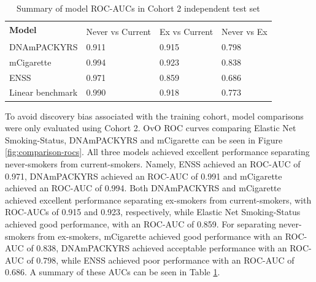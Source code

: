 \documentclass[draft]{article} %
\begin{document}
\begin{table}[p]
    \caption{Summary of model ROC-AUCs in Cohort 2 independent test set} \label{table:auc-comparison}
    \begin{tabularx}{\textwidth}{X >{\centering\arraybackslash}X >{\centering\arraybackslash}X >{\centering\arraybackslash}X}
        \toprule
        \multirow{2}{*}{\textbf{Model}} & \multicolumn{3}{c}{\textbf{AUC}}                               \\
        \cmidrule(lr){2-4}
                                        & Never vs Current                 & Ex vs Current & Never vs Ex \\
        \midrule
        DNAmPACKYRS                     & \num{0.911}                      & \num{0.915}   & \num{0.798} \\
        \addlinespace
        mCigarette                      & \num{0.994}                      & \num{0.923}   & \num{0.838} \\
        \addlinespace
        ENSS                            & \num{0.971}                      & \num{0.859}   & \num{0.686} \\
        \addlinespace
        Linear benchmark                & \num{0.990}                      & \num{0.918}   & \num{0.773} \\
        \bottomrule
    \end{tabularx}
\end{table}

To avoid discovery bias associated with the training cohort, model comparisons were only evaluated using Cohort 2. OvO ROC curves comparing Elastic Net Smoking-Status, DNAmPACKYRS and mCigarette can be seen in Figure \ref{fig:comparison-rocs}. All three models achieved excellent performance separating never-smokers from current-smokers. Namely, ENSS achieved an ROC-AUC of 0.971, DNAmPACKYRS achieved an ROC-AUC of 0.991 and mCigarette achieved an ROC-AUC of 0.994. Both DNAmPACKYRS and mCigarette achieved excellent performance separating ex-smokers from current-smokers, with ROC-AUCs of 0.915 and 0.923, respectively, while Elastic Net Smoking-Status achieved good performance, with an ROC-AUC of 0.859. For separating never-smokers from ex-smokers, mCigarette achieved good performance with an ROC-AUC of 0.838, DNAmPACKYRS achieved acceptable performance with an ROC-AUC of 0.798, while ENSS achieved poor performance with an ROC-AUC of 0.686. A summary of these AUCs can be seen in Table \ref{table:auc-comparison}.
\end{document}
